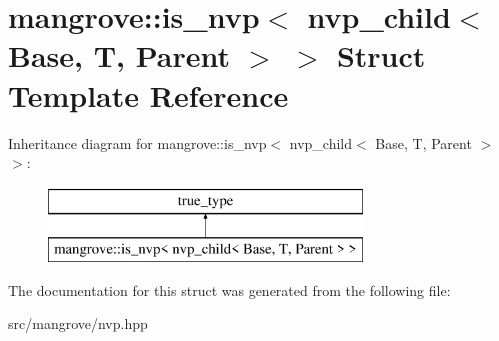 \hypertarget{structmangrove_1_1is__nvp_3_01nvp__child_3_01Base_00_01T_00_01Parent_01_4_01_4}{}\section{mangrove\+:\+:is\+\_\+nvp$<$ nvp\+\_\+child$<$ Base, T, Parent $>$ $>$ Struct Template Reference}
\label{structmangrove_1_1is__nvp_3_01nvp__child_3_01Base_00_01T_00_01Parent_01_4_01_4}
Inheritance diagram for mangrove\+:\+:is\+\_\+nvp$<$ nvp\+\_\+child$<$ Base, T, Parent $>$ $>$\+:\begin{figure}[H]
\begin{center}
\leavevmode
\includegraphics[height=2.000000cm]{structmangrove_1_1is__nvp_3_01nvp__child_3_01Base_00_01T_00_01Parent_01_4_01_4}
\end{center}
\end{figure}


The documentation for this struct was generated from the following file\+:\begin{DoxyCompactItemize}
\item 
src/mangrove/nvp.\+hpp\end{DoxyCompactItemize}
